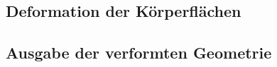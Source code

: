    




      




  



       
 







\subsection{Deformation der Körperflächen}

\subsection{Ausgabe der verformten Geometrie}





           


       

        








    













  
